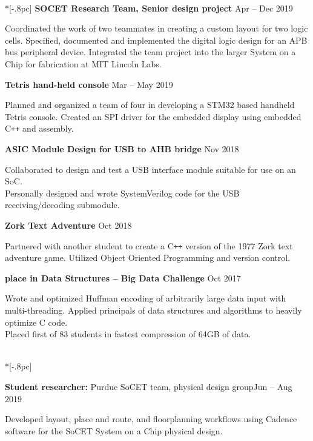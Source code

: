 \documentclass{article}
\begin{document}
\vspace{5pt}{\large \bf Research and Project Experience} \\*[-.8pc]
\underline{\hspace{6in}}
{\bf SOCET Research Team, Senior design project} \hfill Apr -- Dec 2019
\begin{adjustwidth}{20pt}{}
Coordinated the work of two teammates in creating a custom layout for two logic cells.
Specified, documented and implemented the digital logic design for an APB bus peripheral device.
Integrated the team project into the larger System on a Chip for fabrication at MIT Lincoln Labs.
\end{adjustwidth}
{\bf Tetris hand-held console} \hfill Mar -- May 2019
\begin{adjustwidth}{20pt}{}
Planned and organized a team of four in developing a STM32 based handheld Tetris console.
Created an SPI driver for the embedded display using embedded C\texttt{++} and assembly.
\end{adjustwidth}
{\bf ASIC Module Design for USB to AHB bridge} \hfill Nov 2018
\begin{adjustwidth}{20pt}{}
Collaborated to design and test a USB interface module suitable for use on an SoC.\\
Personally designed and wrote SystemVerilog code for the USB receiving/decoding submodule.
\end{adjustwidth}
{\bf Zork Text Adventure} \hfill Oct 2018
\begin{adjustwidth}{20pt}{}
Partnered with another student to create a C\texttt{++} version of the 1977 Zork text adventure game.
Utilized Object Oriented Programming and version control.
\end{adjustwidth}
{\bf {} place in Data Structures -- Big Data Challenge} \hfill Oct 2017
\begin{adjustwidth}{20pt}{}
Wrote and optimized Huffman encoding of arbitrarily large data input with multi-threading.
Applied principals of data structures and algorithms to heavily optimize C code.\\
Placed first of 83 students in fastest compression of 64GB of data.
\end{adjustwidth}

\vspace{5pt}{\large \bf Work Experience} \\*[-.8pc]
\underline{\hspace{6in}}

\textbf{Student researcher:} Purdue SoCET team, physical design group\hfill Jun -- Aug 2019\\
\vspace{-12pt}
\begin{adjustwidth}{20pt}{}
Developed layout, place and route, and floorplanning workflows using Cadence software for the SoCET System on a Chip physical design.
\end{adjustwidth}
\end{document}
